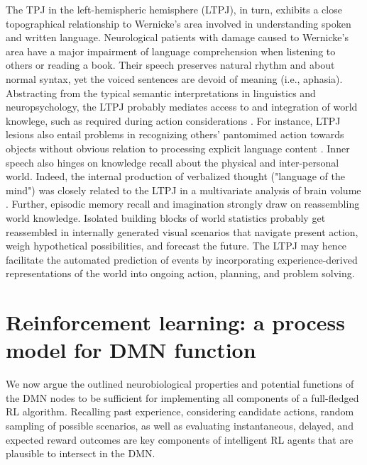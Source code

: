 \documentclass[10pt,letterpaper]{article}
\begin{document}
The TPJ in the left-hemispheric hemisphere (LTPJ),
in turn, exhibits a close topographical relationship to Wernicke's area
involved in understanding spoken and written language.
Neurological patients with damage caused to Wernicke's area
have a major impairment of language comprehension
when listening to others or reading a book.
Their speech
preserves natural rhythm and about normal syntax, yet the
voiced sentences are devoid of meaning (i.e., aphasia).
Abstracting from the typical semantic interpretations in linguistics
and neuropsychology,
the LTPJ probably mediates access to and integration of world knowlege,
such as required during action considerations
\citep{binder2011neurobiology, seghier2013angular}.
For instance, LTPJ lesions also entail problems in recognizing
others' pantomimed action towards objects
without obvious relation to processing explicit language content
\citep{varney1987locus}.
%
Inner speech also hinges on knowledge recall
about the physical and inter-personal world.
Indeed,
the internal production of
verbalized thought ("language of the mind") was closely related to the LTPJ
in a multivariate analysis of brain volume
\citep{geva2011neural}.
Further,
episodic memory recall and imagination strongly draw on
reassembling world knowledge.
Isolated building blocks of world statistics probably get reassembled
in internally generated visual scenarios that
navigate present action, weigh hypothetical possibilities, and forecast the future.
%
The LTPJ may hence facilitate the automated prediction of events
by incorporating experience-derived representations of the world
into ongoing action, planning, and problem solving.



\section{Reinforcement learning: a process model for DMN function}
We now argue the outlined neurobiological properties
and potential functions of the DMN nodes
to be sufficient for implementing all components
of a full-fledged RL algorithm.
Recalling past experience, considering candidate actions,
random sampling of possible scenarios, as well as
evaluating instantaneous, delayed, and expected reward outcomes
are key components of intelligent RL agents
that are plausible to intersect in the DMN.
\end{document}
